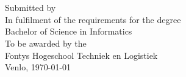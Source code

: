 \begin{titlepage}

\center %


\vspace*{3cm}

{\huge \bfseries \thesistitle} \\[0.5cm] %
{\large \bfseries \documenttype } \\[4cm]
 

{\normalsize	Submitted by \student}\\[2cm] %

{\normalsize	In fulfilment of the requirements for the degree \\
Bachelor of Science in Informatics \\
To be awarded by the \\
Fontys Hogeschool Techniek en Logistiek
}\\[4cm]%

{\normalsize Venlo, \today}



\vfill %

\end{titlepage}